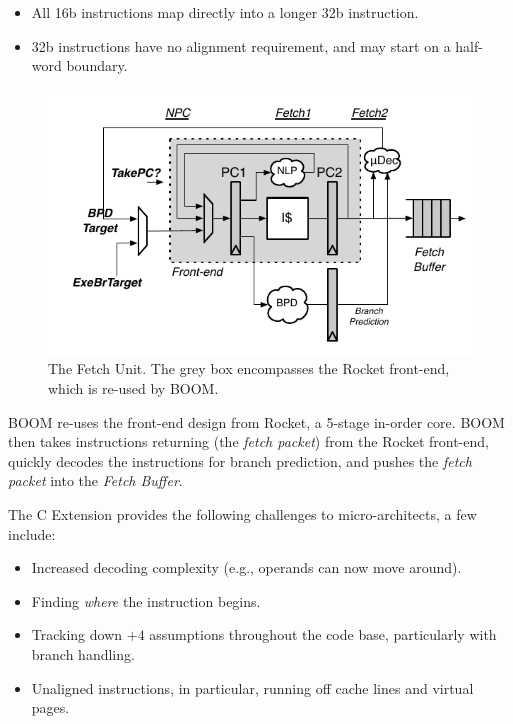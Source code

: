 \begin{itemize}
\item All 16b instructions map directly into a longer 32b instruction. 
\item 32b instructions have no alignment requirement, and may start on a half-word boundary.
\end{itemize}

\begin{figure}[ht]
	\centering
	\centerline{\includegraphics[scale =1] {figures/frontend}}
	\caption{ \small The Fetch Unit. The grey box encompasses the Rocket front-end, which is re-used by BOOM.}
	\label{fig:lsu}
\end{figure}

BOOM re-uses the front-end design from Rocket, a 5-stage in-order core.  BOOM then takes instructions returning (the {\em fetch packet}) from the Rocket front-end, quickly decodes the instructions for branch prediction, and pushes the {\em fetch packet} into the {\em Fetch Buffer}. 


The C Extension provides the following challenges to micro-architects, a few include:

\begin{itemize}
\item Increased decoding complexity (e.g., operands can now move around). 
\item Finding {\em where} the instruction begins. 
\item Tracking down $+4$ assumptions throughout the code base, particularly with branch handling.
\item Unaligned instructions, in particular, running off cache lines and virtual pages. 
\end{itemize}

